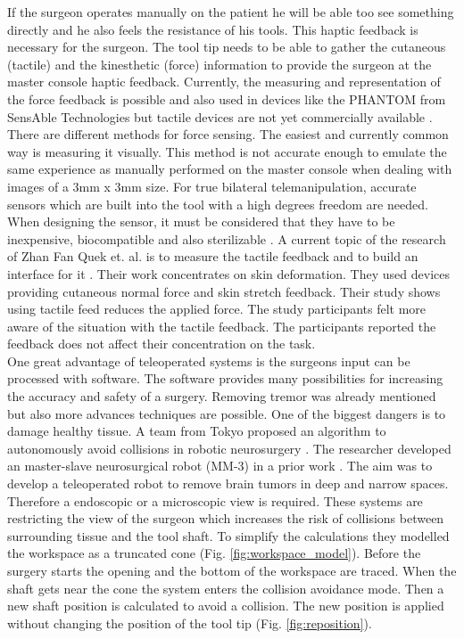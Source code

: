 \newpage
If the surgeon operates manually on the patient he will be able too see something directly and he also feels the resistance of his tools. This haptic feedback is necessary for the surgeon. The tool tip needs to be able to gather the cutaneous (tactile) and the kinesthetic (force) information to provide the surgeon at the master console haptic feedback. Currently, the measuring and representation of the force feedback is possible and also used in devices like the PHANTOM from SensAble Technologies but \grqq tactile devices are not yet commercially available \grqq \cite{force_feedback}. \\
There are different methods for force sensing. The easiest and currently common way is measuring it visually. This method is not accurate enough to emulate the same experience as manually performed on the master console when dealing with images of a 3mm x 3mm size. For true bilateral telemanipulation, accurate sensors which are built into the tool with a high degrees freedom are needed. When designing the sensor, it must be considered that they have to be inexpensive, biocompatible and also sterilizable \cite{force_feedback}. A current topic of the research of Zhan Fan Quek et. al. is to measure the tactile feedback and to build an interface for it \cite{tactile_feedback}. Their work concentrates on skin deformation. They used devices providing cutaneous normal force and skin stretch feedback. Their study shows using tactile feed reduces the applied force. The study participants felt more aware of the situation with the tactile feedback. The participants reported the feedback does not affect their concentration on the task. \\
One great advantage of teleoperated systems is  the surgeons input can be processed with software. The software provides many possibilities for increasing the accuracy and safety of a surgery. Removing tremor was already mentioned but also more advances techniques are possible. One of the biggest dangers is to damage healthy tissue. A team from Tokyo proposed an algorithm to autonomously avoid collisions in robotic neurosurgery \cite{collisionAvoidanceNeuro}. The researcher developed an master-slave neurosurgical robot (MM-3) in a prior work \cite{MM3}. The aim was to develop a teleoperated robot to remove brain tumors in deep and narrow spaces. Therefore a endoscopic or a microscopic view is required. These systems are restricting the view of the surgeon which increases the risk of collisions between surrounding tissue and the tool shaft. To simplify the calculations they modelled the workspace as a truncated cone (Fig. \ref{fig:workspace_model}). Before the surgery starts the opening and the bottom of the workspace are traced. When the shaft gets near the cone the system enters the collision avoidance mode. Then a new shaft position is calculated to avoid a collision. The new position is applied without changing the position of the tool tip (Fig. \ref{fig:reposition}).
